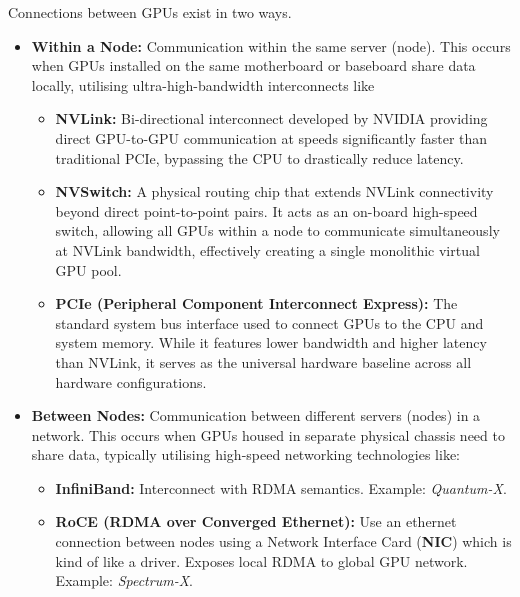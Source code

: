 Connections between GPUs exist in two ways.
\begin{itemize}
    \item \textbf{Within a Node:} Communication within the same server (node). 
    This occurs when GPUs installed on the same motherboard or baseboard share data locally, utilising ultra-high-bandwidth interconnects like 
    \begin{itemize}
        \item \textbf{NVLink:} Bi-directional interconnect developed by NVIDIA providing direct GPU-to-GPU communication at speeds significantly faster than traditional PCIe, bypassing the CPU to drastically reduce latency.
        \item \textbf{NVSwitch:} A physical routing chip that extends NVLink connectivity beyond direct point-to-point pairs. 
        It acts as an on-board high-speed switch, allowing all GPUs within a node to communicate simultaneously at NVLink bandwidth, effectively creating a single monolithic virtual GPU pool.
        \item \textbf{PCIe (Peripheral Component Interconnect Express):} The standard system bus interface used to connect GPUs to the CPU and system memory. 
        While it features lower bandwidth and higher latency than NVLink, it serves as the universal hardware baseline across all hardware configurations.
    \end{itemize}
    \item \textbf{Between Nodes:} Communication between different servers (nodes) in a network. 
    This occurs when GPUs housed in separate physical chassis need to share data, typically utilising high-speed networking technologies like:
    \begin{itemize}
        \item \textbf{InfiniBand:} Interconnect with RDMA semantics. Example: \textit{Quantum-X}.
        \item \textbf{RoCE (RDMA over Converged Ethernet):} Use an ethernet connection between nodes using a Network Interface Card (\textbf{NIC}) which is kind of like a driver. 
        Exposes local RDMA to global GPU network. Example: \textit{Spectrum-X}.
    \end{itemize}
\end{itemize}


